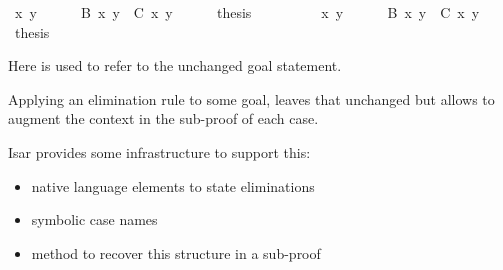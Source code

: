 \begin{isabellebody}
\ x\ y\isanewline
\ \ \ \ \isamarkupfalse%
\ {}B{}\ x\ y{}\ \ {}C{}\ x\ y{}\isanewline
\ \ \ \ \isamarkupfalse%
\ {}thesis\ \isamarkupfalse%
\isanewline
\ \ \isamarkupfalse%
\isanewline
\ \ \ \ \isamarkupfalse%
\ x\ y\isanewline
\ \ \ \ \isamarkupfalse%
\ {}B{}\ x\ y{}\ \ {}C{}\ x\ y{}\isanewline
\ \ \ \ \isamarkupfalse%
\ {}thesis\ \isamarkupfalse%
\isanewline
\ \ \isamarkupfalse%
%
\endisatagproof
{\isafoldproof}%
%
\isadelimproof
\isanewline
%
\endisadelimproof
{}\isamarkupfalse%
%
\begin{isamarkuptext}%
Here  is used to refer to the unchanged goal
  statement.%
\end{isamarkuptext}%
\isamarkuptrue%
%
\isamarkuptrue%
%
\begin{isamarkuptext}%
Applying an elimination rule to some goal, leaves that unchanged
  but allows to augment the context in the sub-proof of each case.

  Isar provides some infrastructure to support this:

  \begin{itemize}

  \item native language elements to state eliminations

  \item symbolic case names

  \item method \hyperlink{method.cases}{\mbox{}} to recover this structure in a
  sub-proof


\end{itemize}
\end{isamarkuptext}
\end{isabellebody}
